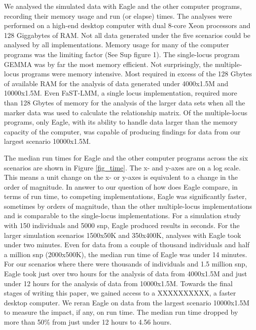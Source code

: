 \documentclass{nature}
\begin{document}
We analysed the simulated data with Eagle and the other computer programs, recording their memory usage and 
run (or elapse) times. The analyses were performed on a high-end desktop computer with dual 8-core Xeon processors and 128 Giggabytes of RAM. Not all data generated under the five scenarios could be analysed by all implementations. Memory usage 
for many of the computer programs was the limiting factor (See Sup figure 1).  The single-locus program GEMMA was by 
far the most memory efficient. Not surprisingly, the multiple-locus programs were memory intensive. Most required in 
excess of the 128 Gbytes of available RAM for the analysis of data generated under 4000x1.5M and 10000x1.5M.  Even FaST-LMM, a single locus
implementation, required more than 128 Gbytes of memory for the analysis of the larger data sets 
when all the marker data was used to calculate the relationship matrix. Of the multiple-locus programs, only Eagle,  
with its ability to handle data larger than the memory capacity of the computer, was capable of producing findings 
for data from our largest scenario 10000x1.5M. 


The median run times for Eagle and the other computer programs across the six scenarios are shown in Figure \ref{fig_time}. 
The x- and y-axes are on a log scale.  This means a unit change on the x- or y-axes is equivalent to a change in the order of magnitude.  In answer to our question of how does Eagle compare, in terms of run time, to competing implementations, 
Eagle was significantly faster, sometimes by orders of magnitude,  than the other multiple-locus
 implementations and is comparable to the single-locus implementations. For a simulation study with 150 individuals and 
 5000 snp, Eagle produced results in seconds.  For the larger simulation scenarios 1500x50K and 350x400K, 
 analyses with Eagle took under two minutes. Even for data from a couple of thousand individuals and half a million 
 snp (2000x500K), the median run time of Eagle was under 14 minutes. For our scenarios where there 
 were thousands of individuals and 1.5 million snp, Eagle took just over two hours for the analysis of data from 
 4000x1.5M and just under 12 hours for the analysis of data from 10000x1.5M. 
 Towards the final stages of writing this paper, 
 we gained access to a XXXXXXXXXX, a faster desktop computer. We reran Eagle on data from the largest
  scenario 10000x1.5M to measure the impact, if any, on run time. The median run time dropped by more than 50\% 
  from just under 12 hours to 4.56 hours. 
 
\end{document}
